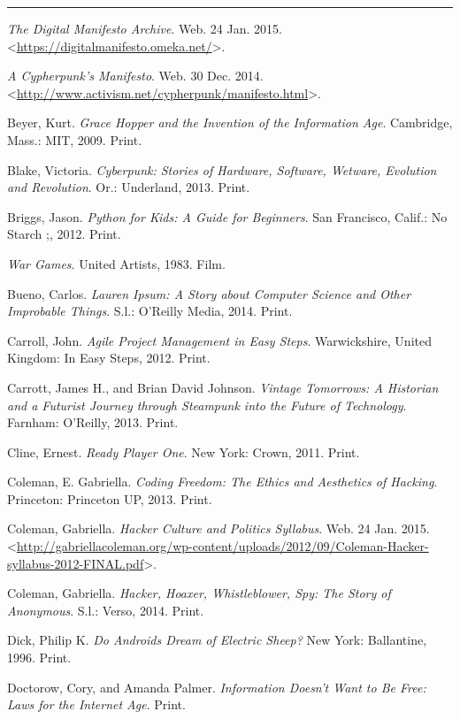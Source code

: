 \documentclass[letterpaper,10pt,english]{sphinxmanual}
\begin{document}
\bigskip\hrule{}\bigskip


\emph{The Digital Manifesto Archive}. Web. 24 Jan. 2015. \textless{}\href{https://digitalmanifesto.omeka.net/}{https://digitalmanifesto.omeka.net/}\textgreater{}.

\emph{A Cypherpunk's Manifesto}. Web. 30 Dec. 2014. \textless{}\href{http://www.activism.net/cypherpunk/manifesto.html}{http://www.activism.net/cypherpunk/manifesto.html}\textgreater{}.

Beyer, Kurt. \emph{Grace Hopper and the Invention of the Information Age}.
Cambridge, Mass.: MIT, 2009. Print.

Blake, Victoria. \emph{Cyberpunk: Stories of Hardware, Software, Wetware,
Evolution and Revolution}. Or.: Underland, 2013. Print.

Briggs, Jason. \emph{Python for Kids: A Guide for Beginners}. San Francisco,
Calif.: No Starch ;, 2012. Print.

\emph{War Games}. United Artists, 1983. Film.

Bueno, Carlos. \emph{Lauren Ipsum: A Story about Computer Science and Other
Improbable Things}. S.l.: O'Reilly Media, 2014. Print.

Carroll, John. \emph{Agile Project Management in Easy Steps}. Warwickshire,
United Kingdom: In Easy Steps, 2012. Print.

Carrott, James H., and Brian David Johnson. \emph{Vintage Tomorrows: A Historian and a Futurist Journey through Steampunk into the Future of
Technology}. Farnham: O'Reilly, 2013. Print.

Cline, Ernest. \emph{Ready Player One}. New York: Crown, 2011. Print.

Coleman, E. Gabriella. \emph{Coding Freedom: The Ethics and Aesthetics of Hacking}. Princeton: Princeton UP, 2013. Print.

Coleman, Gabriella. \emph{Hacker Culture and Politics Syllabus}. Web. 24 Jan. 2015. \textless{}\href{http://gabriellacoleman.org/wp-content/uploads/2012/09/Coleman-Hacker-syllabus-2012-FINAL.pdf}{http://gabriellacoleman.org/wp-content/uploads/2012/09/Coleman-Hacker-syllabus-2012-FINAL.pdf}\textgreater{}.

Coleman, Gabriella. \emph{Hacker, Hoaxer, Whistleblower, Spy: The Story of Anonymous}. S.l.: Verso, 2014. Print.

Dick, Philip K. \emph{Do Androids Dream of Electric Sheep?} New York: Ballantine, 1996. Print.

Doctorow, Cory, and Amanda Palmer. \emph{Information Doesn't Want to Be Free: Laws for the Internet Age}. Print.
\end{document}
